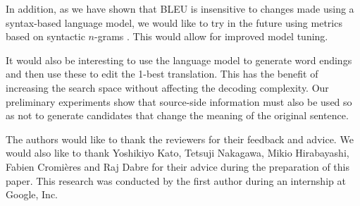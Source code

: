 \documentclass[english]{jnlp_1.4}
\begin{document}
In addition, as we have shown that BLEU is insensitive to changes made using a syntax-based
language model, we would like to try in the future using metrics based on
syntactic $n$-grams \cite{Sennrich15}. This would allow for improved model tuning.

It would also be interesting to use the language model to generate word endings
and then use these to edit the 1-best translation.
This has the benefit of increasing the search space without
affecting the decoding complexity. Our preliminary experiments show that
source-side information must also be used so as not to generate
candidates that change the meaning of the original sentence.


\acknowledgment

The authors would like to thank the reviewers for their feedback and advice.
We would also like to thank Yoshikiyo Kato, Tetsuji Nakagawa, Mikio
Hirabayashi, Fabien Cromi\`{e}res and Raj Dabre for their advice during the preparation
of this paper. This research was conducted by the first author
during an internship at Google, Inc.
\end{document}

